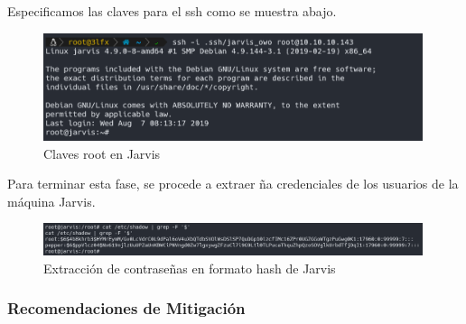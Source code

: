         \large{Especificamos las claves para el ssh como se muestra abajo.}
        \par
        \begin{figure}[H]
            \centering
            \includegraphics[width=0.99\textwidth]{imagenes/jarvis/28_ssh_root_jarvis.png}
            \caption{Claves root en Jarvis}
        \end{figure}

        \large{Para terminar esta fase, se procede a extraer ña credenciales de los usuarios de la máquina Jarvis.}
        \par
        \begin{figure}[H]
            \centering
            \includegraphics[width=0.99\textwidth]{imagenes/jarvis/29_hashes_jarvis.png}
            \caption{Extracción de contraseñas en formato hash de Jarvis}
        \end{figure}

    \subsubsection{Recomendaciones de Mitigación}
